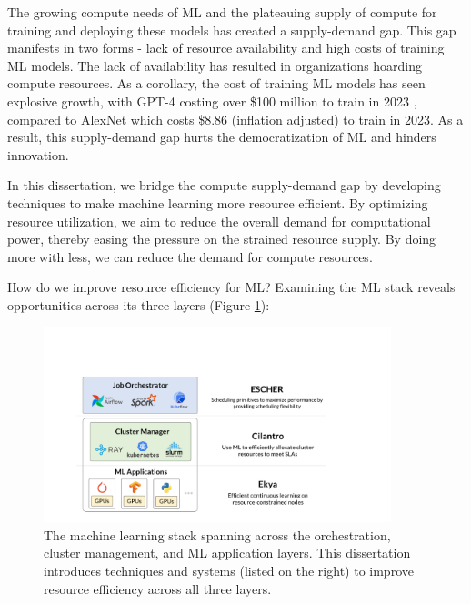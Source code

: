 The growing compute needs of ML and the plateauing supply of compute for training and deploying these models has created a supply-demand gap. This gap manifests in two forms - lack of resource availability and high costs of training ML models. The lack of availability \cite{gpuavailabilitywsj,gpuavailabilitytheinformation,gpuavailabilitywired} has resulted in organizations hoarding compute resources. As a corollary, the cost of training ML models has seen explosive growth, with GPT-4 costing over \$100 million to train in 2023 \cite{gpt4traincost}, compared to AlexNet which costs \$8.86 (inflation adjusted) to train in 2023\cite{mlmodelcost}. As a result, this supply-demand gap hurts the democratization of ML and hinders innovation.

In this dissertation, we bridge the compute supply-demand gap by developing techniques to make machine learning more resource efficient. By optimizing resource utilization, we aim to reduce the overall demand for computational power, thereby easing the pressure on the strained resource supply. By doing more with less, we can reduce the demand for compute resources. 

How do we improve resource efficiency for ML? Examining the ML stack reveals opportunities across its three layers (Figure \ref{fig:ml_stack}):

\begin{figure}
    \centering
    \includegraphics[width=0.9\textwidth]{intro/figures/MLStack.pdf}
    \caption{The machine learning stack spanning across the orchestration, cluster management, and ML application layers. This dissertation introduces techniques and systems (listed on the right) to improve resource efficiency across all three layers.}
    \label{fig:ml_stack}
\end{figure}


